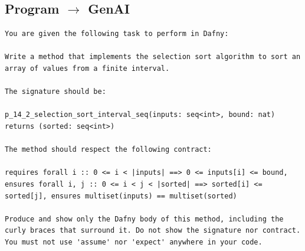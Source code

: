 \documentclass{article}
\begin{document}
\subsection*{Program $\rightarrow$ GenAI}
\begin{lstlisting}
You are given the following task to perform in Dafny:

Write a method that implements the selection sort algorithm to sort an array of values from a finite interval.

The signature should be:

p_14_2_selection_sort_interval_seq(inputs: seq<int>, bound: nat) returns (sorted: seq<int>)

The method should respect the following contract:

requires forall i :: 0 <= i < |inputs| ==> 0 <= inputs[i] <= bound, ensures forall i, j :: 0 <= i < j < |sorted| ==> sorted[i] <= sorted[j], ensures multiset(inputs) == multiset(sorted)

Produce and show only the Dafny body of this method, including the curly braces that surround it. Do not show the signature nor contract. You must not use 'assume' nor 'expect' anywhere in your code.
\end{lstlisting}
\end{document}
